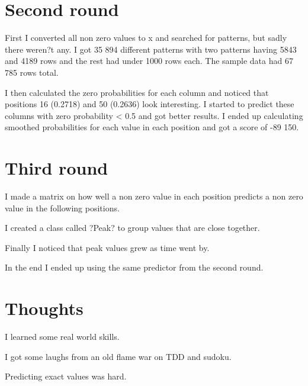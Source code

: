 \documentclass[english]{tktltiki2}
\theoremstyle{definition}
\theoremstyle{remark}
\begin{document}
\section{Second round}

First I converted all non zero values to x and searched for patterns, but sadly there weren?t any. I got 35 894 different patterns with two patterns having 5843 and 4189 rows and the rest had under 1000 rows each. The sample data had 67 785 rows total.

I then calculated the zero probabilities for each column and noticed that positions 16 (0.2718) and 50 (0.2636) look interesting. I started to predict these columns with zero probability < 0.5 and got better results. I ended up calculating smoothed probabilities for each value in each position and got a score of -89 150.

\section{Third round}

I made a matrix on how well a non zero value in each position predicts a non zero value in the following positions.

I created a class called ?Peak? to group values that are close together. 

Finally I noticed that peak values grew as time went by.

In the end I ended up using the same predictor from the second round.

\section{Thoughts}

I learned some real world skills.

I got some laughs from an old flame war on TDD and sudoku.

Predicting exact values was hard.

%
%
% 
%







% 
\end{document}
